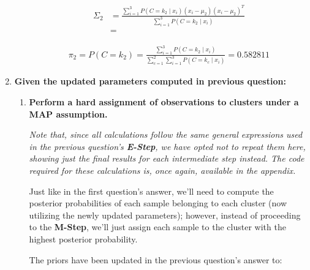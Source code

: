 \documentclass[12pt]{article}
\begin{document}
\begin{enumerate}[leftmargin=\labelsep]
\begin{itemize}[leftmargin=]
                \begin{equation*}
                  \begin{aligned}
                    \Sigma_2 & = \frac{\sum_{i=1}^3 P(C = k_2 \mid x_i) (x_{i} - \mu_{2}) (x_{i} - \mu_{2})^T}{\sum_{i=1}^3 P(C = k_2 \mid x_i)} \\
                             & = 
                  \end{aligned}
                \end{equation*}

                \begin{equation*}
                  \begin{aligned}
                    \pi_2 = P(C = k_2) = \frac{\sum_{i=1}^3 P(C = k_2 \mid x_i)}{\sum_{c=1}^2\sum_{i=1}^3 P(C = k_c \mid x_i)} = 0.582811
                  \end{aligned}
                \end{equation*}

        \end{itemize}

        \pagebreak

  \item \textbf{Given the updated parameters computed in previous question:}

        \begin{enumerate}[leftmargin=\labelsep]
          \item \textbf{Perform a hard assignment of observations to clusters under a MAP assumption.}

                \textit{Note that, since all calculations follow the same general expressions used
                  in the previous question's \textbf{E-Step}, we have opted not to repeat them here,
                  showing just the final results for each intermediate step instead.
                  The code required for these calculations is, once again, available in the
                  appendix.}

                Just like in the first question's answer, we'll need to compute the posterior
                probabilities of each sample belonging to each cluster (now utilizing the newly updated
                parameters); however, instead of proceeding to the \textbf{M-Step}, we'll just assign
                each sample to the cluster with the highest posterior probability.

                The priors have been updated in the previous question's answer to:


\end{enumerate}
\end{enumerate}
\end{document}

